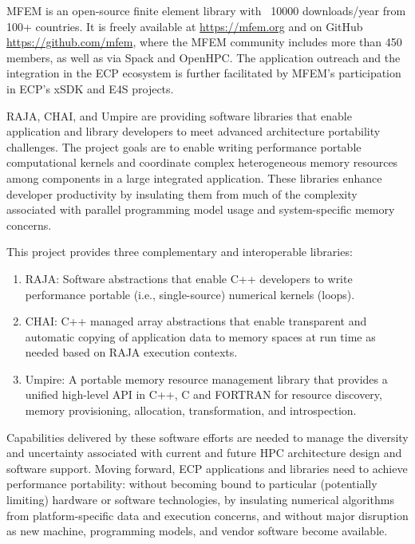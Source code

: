 MFEM is an open-source finite element library with ~10000 downloads/year from 100+
countries. It is freely available at \url{https://mfem.org} and on GitHub
\url{https://github.com/mfem}, where the MFEM community includes more than 450
members, as well as via Spack and OpenHPC. The application outreach and the
integration in the ECP ecosystem is further facilitated by MFEM's participation
in ECP's xSDK and E4S projects.

RAJA, CHAI, and Umpire are providing software libraries that enable
application and library developers to meet advanced architecture
portability challenges. The project goals are to enable writing
performance portable computational kernels and coordinate complex
heterogeneous memory resources among components in a large integrated
application. These libraries enhance developer productivity by insulating
them from much of the complexity associated with parallel programming
model usage and system-specific memory concerns.

This project provides three complementary
and interoperable libraries:

\begin{enumerate}

\item RAJA: Software abstractions that enable C++ developers to write
    performance portable (i.e., single-source) numerical kernels (loops).

\item CHAI: C++ managed array abstractions that enable transparent
    and automatic copying of application data to memory spaces at run
    time as needed based on RAJA execution contexts.

\item Umpire: A portable memory resource management library that provides
    a unified high-level API in C++, C and FORTRAN for resource
    discovery, memory provisioning, allocation, transformation, and
    introspection.

\end{enumerate}

Capabilities delivered by these software efforts are needed to manage the
diversity and uncertainty associated with current and future HPC
architecture design and software support. Moving forward, ECP
applications and libraries need to achieve performance portability:
without becoming bound to particular (potentially limiting) hardware or
software technologies, by insulating numerical algorithms from
platform-specific data and execution concerns, and without major
disruption as new machine, programming models, and vendor software become
available.

